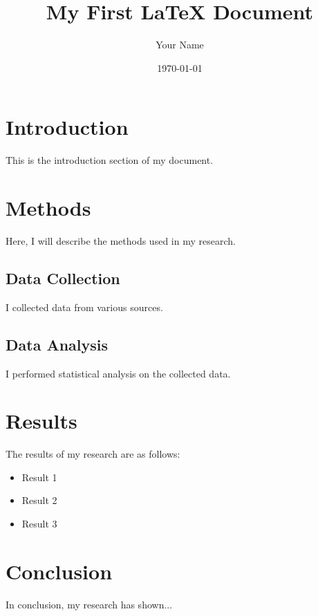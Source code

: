\documentclass{article}
\begin{document}
\title{My First LaTeX Document}
\author{Your Name}
\date{\today}

\maketitle

\section{Introduction}

This is the introduction section of my document.

\section{Methods}

Here, I will describe the methods used in my research.

\subsection{Data Collection}

I collected data from various sources.

\subsection{Data Analysis}

I performed statistical analysis on the collected data.

\section{Results}

The results of my research are as follows:

\begin{itemize}
  \item Result 1
  \item Result 2
  \item Result 3
\end{itemize}

\section{Conclusion}

In conclusion, my research has shown...
\end{document}
